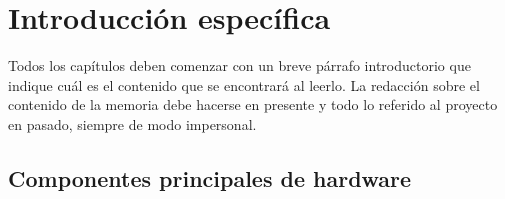 \chapter{Introducción específica} %

\label{Chapter2}

Todos los capítulos deben comenzar con un breve párrafo introductorio que indique cuál es el contenido que se encontrará al leerlo.  La redacción sobre el contenido de la memoria debe hacerse en presente y todo lo referido al proyecto en pasado, siempre de modo impersonal.

\section{Componentes principales de hardware}
\label{sec:ejemplo}

